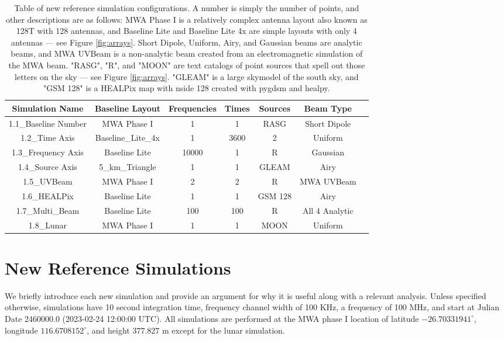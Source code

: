 \documentclass{article}
\begin{document}
\begin{table}[h!]
\setlength\belowcaptionskip{-20pt}
    \centering
    \begin{tabular}{|c|c|c|c|c|c|c}\hline
    Simulation Name & Baseline Layout & Frequencies & Times & Sources & Beam Type\\\hline
    1.1\_Baseline Number & MWA Phase I & 1 & 1 & RASG & Short Dipole\\
    1.2\_Time Axis & Baseline\_Lite\_4x & 1 & 3600 & 2 & Uniform\\
    1.3\_Frequency Axis & Baseline Lite & 10000 & 1 & R & Gaussian\\
    1.4\_Source Axis & 5\_km\_Triangle & 1 & 1 & GLEAM & Airy\\
    1.5\_UVBeam & MWA Phase I & 2 & 2 &  R & MWA UVBeam\\
    1.6\_HEALPix & Baseline Lite & 1 & 1 & GSM 128 & Airy\\
    1.7\_Multi\_Beam & Baseline Lite & 100 & 100 & R & All 4 Analytic\\
    1.8\_Lunar & MWA Phase I & 1 & 1 & MOON & Uniform\\
    \hline\end{tabular}
    \caption{Table of new reference simulation configurations. A number is simply the number of points, and other descriptions are as follows: MWA Phase I is a relatively complex antenna layout also known as 128T with 128 antennas, and Baseline Lite and Baseline Lite 4x are simple layouts with only 4 antennas --- see Figure \ref{fig:arrays}. Short Dipole, Uniform, Airy, and Gaussian beams are analytic beams, and MWA UVBeam is a non-analytic beam created from an electromagnetic simulation of the MWA beam. "RASG", "R", and "MOON" are text catalogs of point sources that spell out those letters on the sky --- see Figure \ref{fig:arrays}. "GLEAM" is a large skymodel of the south sky, and "GSM 128" is a HEALPix map with nside 128 created with pygdsm and healpy.}
    \label{tab:my_label}
\end{table}



\section*{New Reference Simulations}

We briefly introduce each new simulation and provide an argument for why it is useful along with a relevant analysis. Unless specified otherwise, simulations have 10 second integration time, frequency channel width of 100 KHz, a frequency of 100 MHz, and start at Julian Date 2460000.0 (2023-02-24 12:00:00 UTC). All simulations are performed at the MWA phase I location of latitude $-26.70331941^\circ$, longitude $116.6708152^\circ$, and height $377.827 \text{ m}$ except for the lunar simulation.
\end{document}
